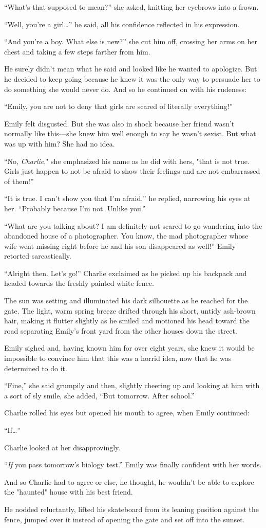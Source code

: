 “What's that supposed to mean?” she asked, knitting her eyebrows into a frown.

“Well, you're a girl…” he said, all his confidence reflected in his expression.

“And you're a boy. What else is new?” she cut him off, crossing her arms on her chest and taking a few steps farther from him.

He surely didn't mean what he said and looked like he wanted to apologize. But he decided to keep going because he knew it was the only way to persuade her to do something she would never do. And so he continued on with his rudeness:

“Emily, you are not to deny that girls are scared of literally everything!”

Emily felt disgusted. But she was also in shock because her friend wasn't normally like this—she knew him well enough to say he wasn't sexist. But what was up with him? She had no idea.

“No, \textit{Charlie}," she emphasized his name as he did with hers, "that is not true. Girls just happen to not be afraid to show their feelings and are not embarrassed of them!”

“It is true. I can't show you that I'm afraid,” he replied, narrowing his eyes at her. “Probably because I'm not. Unlike you.”

“What are you talking about? I am definitely not scared to go wandering into the abandoned house of a photographer. You know, the mad photographer whose wife went missing right before he and his son disappeared as well!” Emily retorted sarcastically.

“Alright then. Let's go!” Charlie exclaimed as he picked up his backpack and headed towards the freshly painted white fence.

The sun was setting and illuminated his dark silhouette as he reached for the gate. The light, warm spring breeze drifted    through his short, untidy ash-brown hair, making it flutter slightly as he smiled and motioned his head toward the road separating Emily's front yard from the other houses down the street.

Emily sighed and, having known him for over eight years, she knew it would be impossible to convince him that this was a horrid idea, now that he was determined to do it.

“Fine,” she said grumpily and then, slightly cheering up and looking at him with a sort of sly smile, she added, “But tomorrow. After school.”

Charlie rolled his eyes but opened his mouth to agree, when Emily continued:

“If…”

Charlie looked at her disapprovingly.

“\textit{If} you pass tomorrow's biology test.” Emily was finally confident with her words.

And so Charlie had to agree or else, he thought, he wouldn't be able to explore the "haunted" house with his best friend.

He nodded reluctantly, lifted his skateboard from its leaning position against the fence, jumped over it instead of opening the gate and set off into the sunset.